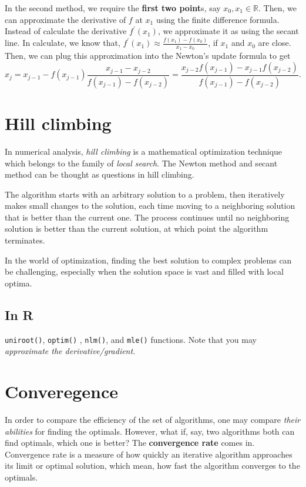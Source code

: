\documentclass[
  letterpaper,
  DIV=11,
  numbers=noendperiod]{scrreprt}
\begin{document}
In the second method, we require the \textbf{first two point}s, say
\(x_0, x_1 \in \mathbb R\). Then, we can approximate the derivative of
\(f\) at \(x_1\) using the finite difference formula. Instead of
calculate the derivative \(f^\prime(x_1)\), we approximate it as using
the secant line. In calculate, we know that,
\(f^\prime(x_1) \approx \frac{f(x_1)-f(x_0)}{x_1-x_0}\), if \(x_1\) and
\(x_0\) are close. Then, we can plug this approximation into the
Newton's update formula to get
\[x_j  = x_{j-1}  - f(x_{j-1}) \frac{x_{j-1}-x_{j-2}}{f(x_{j-1}) - f(x_{j-2})} = \frac{x_{j-2} f\left(x_{j-1}\right)-x_{j-1} f\left(x_{j-2}\right)}{f\left(x_{j-1}\right)-f\left(x_{j-2}\right)} .\]

\section{Hill climbing}\label{hill-climbing}

In numerical analysis, \emph{hill climbing} is a mathematical
optimization technique which belongs to the family of \emph{local
search}. The Newton method and secant method can be thought as questions
in hill climbing.

The algorithm starts with an arbitrary solution to a problem, then
iteratively makes small changes to the solution, each time moving to a
neighboring solution that is better than the current one. The process
continues until no neighboring solution is better than the current
solution, at which point the algorithm terminates.

In the world of optimization, finding the best solution to complex
problems can be challenging, especially when the solution space is vast
and filled with local optima.

\subsection{In R}\label{in-r}

\texttt{uniroot()}, \texttt{optim()} , \texttt{nlm()}, and
\texttt{mle()} functions. Note that you may \emph{approximate the
derivative/gradient}.

\section{Converegence}\label{converegence}

In order to compare the efficiency of the set of algorithms, one may
compare \emph{their abilities} for finding the optimals. However, what
if, say, two algorithms both can find optimals, which one is better? The
\textbf{convergence rate} comes in. Convergence rate is a measure of how
quickly an iterative algorithm approaches its limit or optimal solution,
which mean, how fast the algorithm converges to the optimals.
\end{document}

